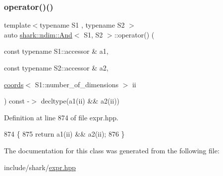 \subsubsection{\texorpdfstring{operator()()}{operator()()}}
{\footnotesize\ttfamily template$<$typename S1 , typename S2 $>$ \\
auto \hyperlink{classshark_1_1ndim_1_1_and}{shark\+::ndim\+::\+And}$<$ S1, S2 $>$\+::operator() (\begin{DoxyParamCaption}\item[{const typename S1\+::accessor \&}]{a1,  }\item[{const typename S2\+::accessor \&}]{a2,  }\item[{\hyperlink{structshark_1_1ndim_1_1coords}{coords}$<$ S1\+::number\+\_\+of\+\_\+dimensions $>$}]{ii }\end{DoxyParamCaption}) const -\/$>$ decltype(a1(ii) \&\& a2(ii)) \hspace{0.3cm}{\ttfamily [inline]}}



Definition at line 874 of file expr.\+hpp.


\begin{DoxyCode}
874                                                                                                            
                                                            \{
875                 \textcolor{keywordflow}{return} a1(ii) && a2(ii);
876             \}
\end{DoxyCode}


The documentation for this class was generated from the following file\+:\begin{DoxyCompactItemize}
\item 
include/shark/\hyperlink{expr_8hpp}{expr.\+hpp}\end{DoxyCompactItemize}

